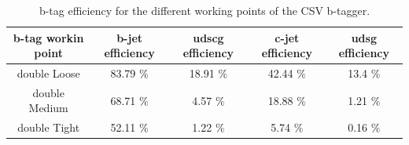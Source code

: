 \begin{table}[h!t]
 \centering
 \caption{b-tag efficiency for the different working points of the CSV b-tagger.}
 \begin{tabular}{c|c|c|c|c}
  b-tag workin point 	& b-jet efficiency 	& udscg efficiency 	& c-jet efficiency 	& udsg efficiency 	\\
  \hline
  double Loose 		& 83.79 $\%$		& 18.91 $\%$		& 42.44 $\%$ 		& 13.4 $\%$		\\
  double Medium 	& 68.71 $\%$		& 4.57 $\%$		& 18.88 $\%$		& 1.21 $\%$		\\
  double Tight 		& 52.11 $\%$ 		& 1.22 $\%$ 		& 5.74 $\%$ 		& 0.16 $\%$ 		\\
 \end{tabular}
\end{table}


